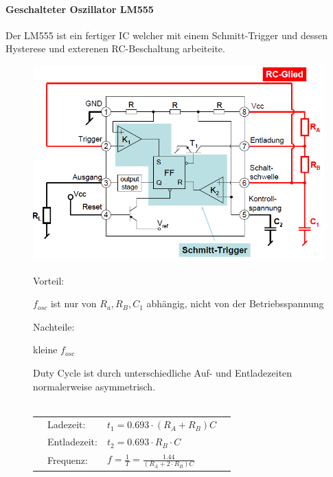\FloatBarrier
\paragraph{Geschalteter Oszillator LM555}
Der LM555 ist ein fertiger IC welcher  mit einem Schmitt-Trigger und dessen Hysterese und exterenen RC-Beschaltung arbeiteite.
\begin{figure}[h!]
	\begin{minipage}{0.5\textwidth} 
	\includegraphics[width=1\textwidth]{images/LM555}
	\end{minipage}
	\begin{minipage}{0.4\textwidth}
	  \begin{compactitem}
        \item Vorteil:
        \begin{compactitem}
           \item $f_{osc}$ ist nur von $R_a, R_B, C_1$ abhängig, nicht von der  Betriebsspannung
        \end{compactitem}
        \item Nachteile:
        \begin{compactitem}
           \item kleine $f_{osc}$
           \item Duty Cycle ist durch unterschiedliche Auf- und Entladezeiten normalerweise asymmetrisch.\\\
        \end{compactitem}
      \end{compactitem}
      \begin{listliketab}
    \begin{tabular}{Llll}
           & Ladezeit:             & $t_1=0.693\cdot(R_A+R_B)C$    \\
           & Entladezeit:          & $t_2=0.693\cdot R_B \cdot C$   \\
           &  Frequenz:             & $f=\frac{1}{T}=\frac{1.44}{(R_A+2\cdot R_B)C}$    \\
    \end{tabular}
\end{listliketab}
	\end{minipage}
\end{figure}


